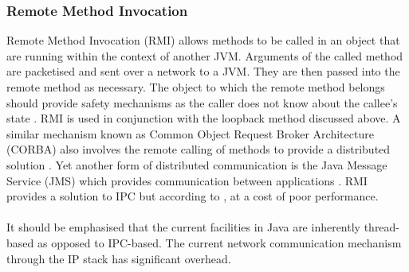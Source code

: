 \documentclass[12pt,a4paper,oneside]{article}
\begin{document}
\subsubsection{Remote Method Invocation}
\begin{spacing}{1.4}
Remote Method Invocation (RMI) allows methods to be called in an object that are running within the context of another JVM. Arguments of the called method are packetised and sent over a network to a JVM. They are then passed into the remote method as necessary. The object to which the remote method belongs should provide safety mechanisms as the caller does not know about the callee's state \citep{JavaConcurrencyInPractice}. RMI is used in conjunction with the loopback method discussed above. A similar mechanism known as Common Object Request Broker Architecture (CORBA) also involves the remote calling of methods to provide a distributed solution \citep{WellsIPCMultiProc}. Yet another form of distributed communication is the Java Message Service (JMS) which provides communication between applications \citep{JavaAPI}. RMI provides a solution to IPC but according to \cite{taboada2013javaforHPC}, at a cost of poor performance.
\\\\
It should be emphasised that the current facilities in Java are inherently thread-based as opposed to IPC-based. The current network communication mechanism through the IP stack has significant overhead.
\end{spacing}
\end{document}
